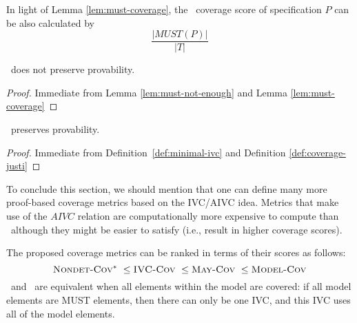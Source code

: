In light of Lemma \ref{lem:must-coverage}, the \nondetcovalt\ coverage score of specification $P$ can be also calculated by
$$\frac{|MUST(P)|}{|T|}$$
\vspace{0.2in}


%
\begin{coroll}
\label{cor:must-not-provable}
\nondetcovalt\ does not preserve provability.
\end{coroll}
\begin{proof}
Immediate from Lemma \ref{lem:must-not-enough} and Lemma \ref{lem:must-coverage}
\end{proof}
\vspace{2mm}
\begin{coroll}
\label{cor:ivc-provable}
\ivccov\ preserves provability.
\end{coroll}
\begin{proof}
Immediate from Definition~\ref{def:minimal-ivc} and Definition \ref{def:coverage-justi}
\end{proof}
\vspace{2mm}


To conclude this section, we should mention that one can define many more proof-based coverage metrics based on the IVC/AIVC idea. Metrics that make use of the $AIVC$ relation are computationally more expensive to compute than \ivccov\ although they might be easier to satisfy (i.e., result in higher coverage scores).

The proposed coverage metrics can be ranked in terms of their scores as follows:
$$\nondetcovalt\ \leq \ivccov\ \leq \maycov\ \leq \allcov$$
\ivccov\ and \nondetcovalt\ are equivalent when all elements within the model are covered: if all model elements are MUST elements, then there can only be one IVC, and this IVC uses all of the model elements.


